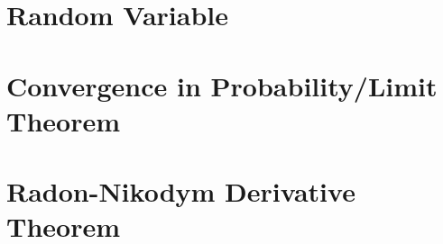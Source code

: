 \documentclass[11pt,fleqn]{book} %
\begin{document}






\chapter{Random Variable}




\chapter{Convergence in Probability/Limit Theorem}




\chapter{Radon-Nikodym Derivative Theorem}


\end{document}
